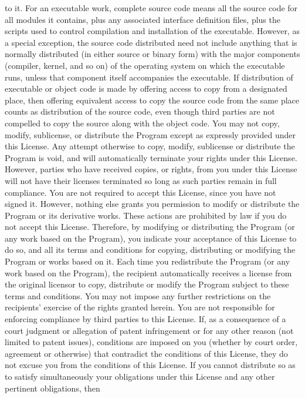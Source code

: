 \documentclass[12pt]{article}
\begin{document}
to it. For an executable work, complete source code means all the source code for all
modules it contains, plus any associated interface definition files, plus the scripts used to
control compilation and installation of the executable. However, as a special exception, the
source code distributed need not include anything that is normally distributed (in either
source or binary form) with the major components (compiler, kernel, and so on) of the
operating system on which the executable runs, unless that component itself accompanies
the executable. If distribution of executable or object code is made by offering access to
copy from a designated place, then offering equivalent access to copy the source code from
the same place counts as distribution of the source code, even though third parties are not
compelled to copy the source along with the object code.
You may not copy, modify, sublicense, or distribute the Program except as expressly
provided under this License. Any attempt otherwise to copy, modify, sublicense or distribute
the Program is void, and will automatically terminate your rights under this License.
However, parties who have received copies, or rights, from you under this License will not
have their licenses terminated so long as such parties remain in full compliance.
You are not required to accept this License, since you have not signed it. However, nothing
else grants you permission to modify or distribute the Program or its derivative works. These
actions are prohibited by law if you do not accept this License. Therefore, by modifying or
distributing the Program (or any work based on the Program), you indicate your acceptance
of this License to do so, and all its terms and conditions for copying, distributing or modifying
the Program or works based on it.
Each time you redistribute the Program (or any work based on the Program), the recipient
automatically receives a license from the original licensor to copy, distribute or modify the
Program subject to these terms and conditions. You may not impose any further restrictions
on the recipients' exercise of the rights granted herein. You are not responsible for enforcing
compliance by third parties to this License.
If, as a consequence of a court judgment or allegation of patent infringement or for any other
reason (not limited to patent issues), conditions are imposed on you (whether by court order,
agreement or otherwise) that contradict the conditions of this License, they do not excuse
you from the conditions of this License. If you cannot distribute so as to satisfy
simultaneously your obligations under this License and any other pertinent obligations, then
\end{document}
